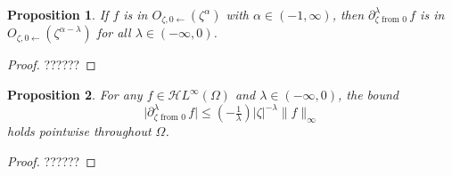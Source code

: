 \documentclass{article}
\theoremstyle{plain}
\newtheorem{prop}{Proposition}
\newcommand{\holoL}[1]{\mathcal{H}L^{#1}} %
\begin{document}
\color{SeaGreen}
\begin{prop}\label{prop:frac-mollify}
If $f$ is in $O_{\zeta, 0 \leftarrow}(\zeta^\alpha)$ with $\alpha \in (-1, \infty)$, then $\partial^\lambda_{\zeta \text{ from } 0}\,f$ is in $O_{\zeta, 0 \leftarrow}(\zeta^{\alpha-\lambda})$ for all $\lambda \in (-\infty, 0)$.
\end{prop}
\color{magenta}
\begin{proof}
??????
\end{proof}
\color{SeaGreen}
\begin{prop}\label{prop:frac-int-growth}
For any $f \in \holoL{\infty}(\Omega)$ and $\lambda \in (-\infty, 0)$, the bound
\[ \big|\partial^\lambda_{\zeta \text{ from } 0}\,f\big| \le (-\tfrac{1}{\lambda}) |\zeta|^{-\lambda} \|f\|_\infty \]
holds pointwise throughout $\Omega$.
\end{prop}
\color{magenta}
\begin{proof}
??????
\end{proof}
\color{DodgerBlue}
\end{document}
